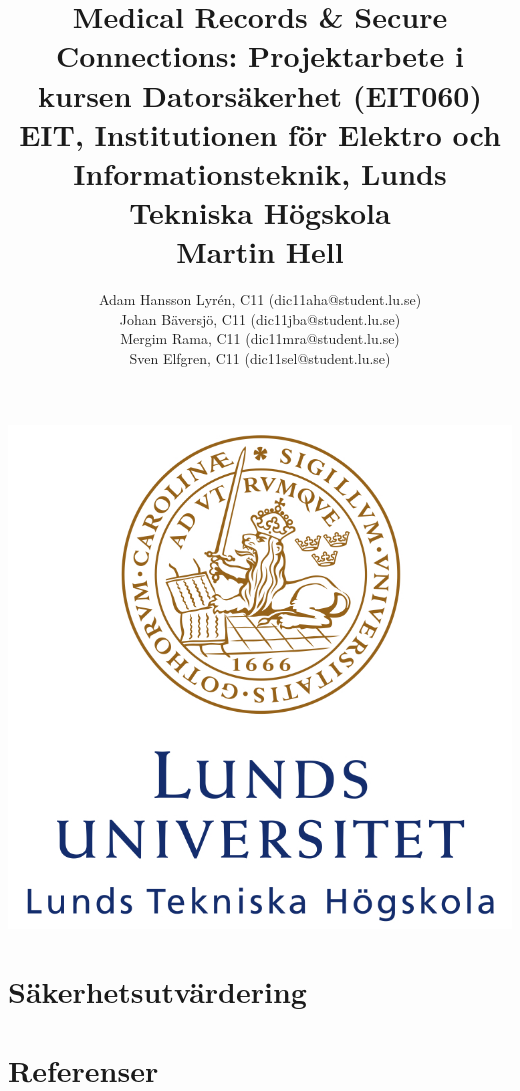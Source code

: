 \documentclass[a4paper]{article}
\title{
	Medical Records \& Secure Connections: Projektarbete i kursen Datorsäkerhet (EIT060)\\
	EIT, Institutionen för Elektro och Informationsteknik, Lunds Tekniska Högskola\\
	Martin Hell}
\author{
Adam Hansson Lyrén, C11 (dic11aha@student.lu.se)\\
Johan Bäversjö, C11 (dic11jba@student.lu.se)\\
Mergim Rama, C11 (dic11mra@student.lu.se)\\
Sven Elfgren, C11 (dic11sel@student.lu.se)\\
}
\begin{document}

\maketitle
\centerline{\includegraphics[scale = 0.6]{LTH.JPG}}
\thispagestyle{empty}
\newpage
\setcounter{page}{1}


\tableofcontents
\newpage









\section{Säkerhetsutvärdering}


\section{Referenser}

\end{document}
